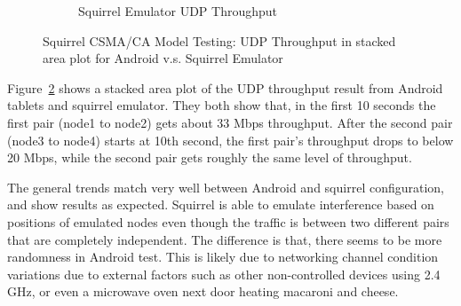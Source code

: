 \documentclass[12pt]{report}
\begin{document}
\begin{figure}[h]
\begin{center}
\begin{subfigure}[h]{\textwidth}
      \caption{\label{fig:squirrel_preliminary_squirrel}Squirrel Emulator UDP Throughput}
    \end{subfigure}
    \caption{\label{fig:squirrel_preliminary}Squirrel CSMA/CA Model Testing: UDP Throughput in stacked area plot for Android v.s. Squirrel Emulator}
  \end{center}
\end{figure}

Figure~\ref{fig:squirrel_preliminary} shows a stacked area plot of the UDP throughput result from Android tablets and squirrel emulator. They both show that, in the first 10 seconds the first pair (node1 to node2) gets about 33 Mbps throughput. After the second pair (node3 to node4) starts at 10th second, the first pair's throughput drops to below 20 Mbps, while the second pair gets roughly the same level of throughput.

The general trends match very well between Android and squirrel configuration, and show results as expected. Squirrel is able to emulate interference based on positions of emulated nodes even though the traffic is between two different pairs that are completely independent. The difference is that, there seems to be more randomness in Android test. This is likely due to networking channel condition variations due to external factors such as other non-controlled devices using 2.4 GHz, or even a microwave oven next door heating macaroni and cheese.
\end{document}
